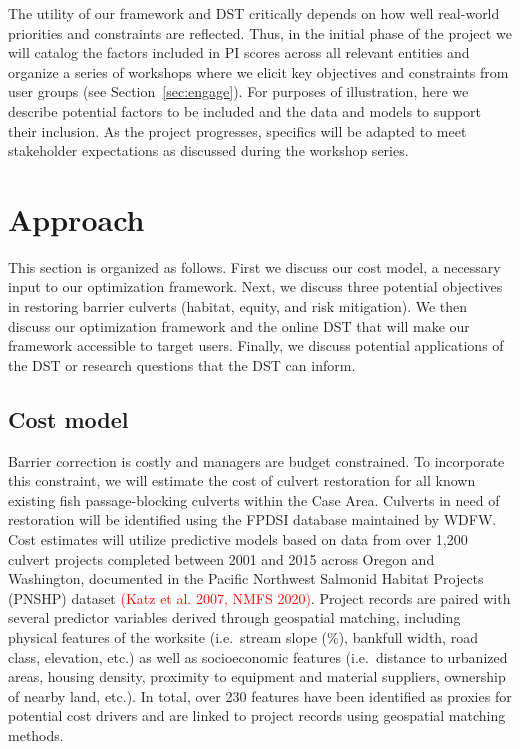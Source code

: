 \documentclass[12pt]{elsarticle}
\begin{document}
The utility of our framework and DST critically depends on how well real-world priorities and constraints are reflected. Thus, in the initial phase of the project we will catalog the factors included in PI scores across all relevant entities and organize a series of workshops where we elicit key objectives and constraints from user groups (see Section~\ref{sec:engage}). For purposes of illustration, here we describe potential factors to be included and the data and models to support their inclusion. As the project progresses, specifics will be adapted to meet stakeholder expectations as discussed during the workshop series.  

%
\section{Approach}


This section is organized as follows. First we discuss our cost model, a necessary input to our optimization framework. Next, we discuss three potential objectives in restoring barrier culverts (habitat, equity, and risk mitigation). We then discuss our optimization framework and the online DST that will make our framework accessible to target users. Finally, we discuss potential applications of the DST or research questions that the DST can inform.

\subsection*{Cost model}



Barrier correction is costly and managers are budget constrained. To incorporate this constraint, we will estimate the cost of culvert restoration for all known existing fish passage-blocking culverts within the Case Area. Culverts in need of restoration will be identified using the FPDSI database maintained by WDFW. Cost estimates will utilize predictive models based on data from over 1,200 culvert projects completed between 2001 and 2015 across Oregon and Washington, documented in the Pacific Northwest Salmonid Habitat Projects (PNSHP) dataset \textcolor{red}{(Katz et al. 2007, NMFS 2020)}. Project records are paired with several predictor variables derived through geospatial matching, including physical features of the worksite (i.e.\ stream slope (\%), bankfull width, road class, elevation, etc.) as well as socioeconomic features (i.e.\ distance to urbanized areas, housing density, proximity to equipment and material suppliers, ownership of nearby land, etc.). In total, over 230 features have been identified as proxies for potential cost drivers and are linked to project records using geospatial matching methods. 
\end{document}

